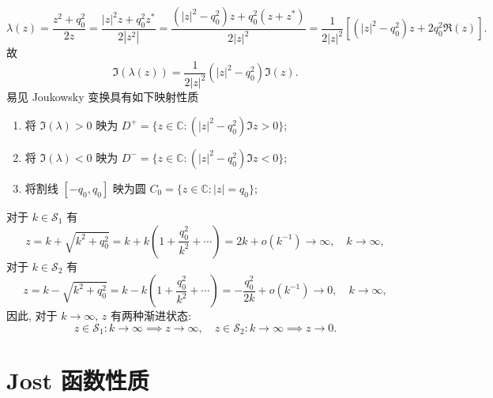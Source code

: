 \begin{equation}
    \lambda(z) = \frac{z^{2} + q_{0}^{2}}{2 z} = \frac{|z|^{2} z + q_{0}^{2} z^{*}}{2 |z^{2}|} = \frac{(|z|^{2}-q_{0}^{2})z + q_{0}^{2}(z + z^{*})}{2 |z|^{2}} = \frac{1}{2|z|^{2}}\left[(|z|^{2}-q_{0}^{2})z + 2 q_{0}^{2} \Re(z)\right].
\end{equation}
故
\begin{equation}
    \Im(\lambda(z)) = \frac{1}{2|z|^{2}}(|z|^{2}-q_{0}^{2})\Im(z).
\end{equation}
易见 Joukowsky 变换具有如下映射性质
\begin{enumerate}
    \item 将 $ \Im(\lambda) > 0 $ 映为 $ D^{+} = \{z \in \mathbb{C}: (|z|^{2} - q_{0}^{2})\Im z > 0\}$;
    \item 将 $ \Im(\lambda) < 0 $ 映为 $ D^{-} = \{z \in \mathbb{C}: (|z|^{2} - q_{0}^{2})\Im z < 0\}$;
    \item 将割线 $ [-q_{0}, q_{0}] $ 映为圆 $ C_{0} = \{z \in \mathbb{C}: |z| = q_{0}\}$;
\end{enumerate}
对于 $ k \in \mathcal{S}_{1} $ 有
\begin{equation}
    z = k + \sqrt{k^{2}+q_{0}^{2}} = k + k(1+\frac{q_{0}^{2}}{k^{2}} + \cdots) = 2k + o(k^{-1}) \to \infty, \quad k \to \infty,
\end{equation}
对于 $ k \in \mathcal{S}_{2} $ 有
\begin{equation}
    z = k - \sqrt{k^{2}+q_{0}^{2}} = k - k(1+\frac{q_{0}^{2}}{k^{2}} + \cdots) = -\frac{q_{0}^{2}}{2k} + o(k^{-1}) \to 0, \quad k \to \infty,
\end{equation}
因此, 对于 $ k \to \infty $, $ z $ 有两种渐进状态:
\begin{equation}
    z \in \mathcal{S}_{1}: k \to \infty \implies z \to \infty, \quad z \in \mathcal{S}_{2}: k \to \infty \implies z \to 0.
\end{equation}
\section{Jost 函数性质}
